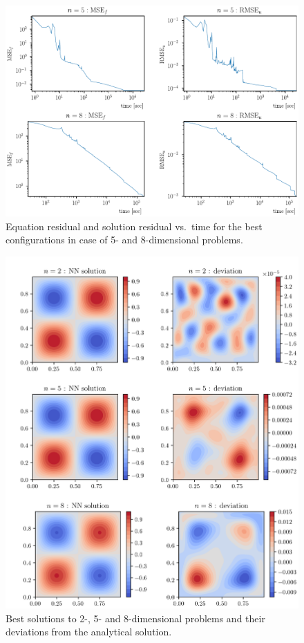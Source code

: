 \documentclass[reprint,
superscriptaddress,
amsmath,amssymb,aps,showkeys,showpacs,
twoside,final,secnumarabic,%
nofootinbib]{revtex4-2}
\begin{document}
\begin{figure}
\includegraphics[width=\textwidth]{img/loss(time).pdf}
\caption{Equation residual and solution residual vs.\ time for the best configurations in case of 5- and 8-dimensional problems.}
\label{train_dynamic}
\end{figure}

\begin{figure}
\includegraphics[width=\textwidth]{img/solution.png}
\caption{Best solutions to 2-, 5- and 8-dimensional problems and their deviations from the analytical solution.}
\label{solution}
\end{figure}
\end{document}

